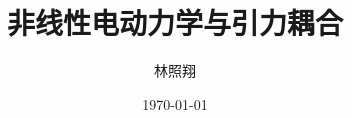 \documentclass[aps,prl,preprint,groupedaddress,showkeys]{revtex4-2}
\begin{document}

\title{非线性电动力学与引力耦合}


\author{林照翔}


\date{\today}
\end{document}

